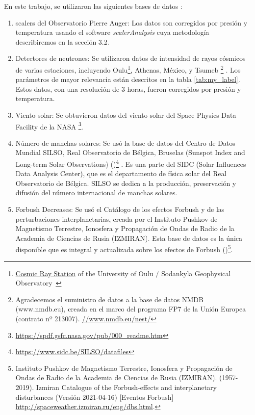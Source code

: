 En este trabajo, se utilizaron las siguientes bases de datos :
\begin{enumerate}

\item scalers del Observatorio Pierre Auger: Los datos son corregidos por presión y temperatura usando el software \textit{scalerAnalysis} cuya metodología describiremos en la sección 3.2.
    \item Detectores de neutrones: Se utilizaron datos de intensidad de rayos cósmicos de varias estaciones, incluyendo Oulu\footnote{\href{https://cosmicrays.oulu.fi/}{Cosmic Ray Station}  of the University of Oulu / Sodankyla Geophysical Observatory 
}, Athenas, México, y Tsumeb  \footnote{Agradecemos el suministro de datos a la base de datos NMDB (www.nmdb.eu), creada en el marco del programa FP7 de la Unión Europea (contrato nº 213007).  \url{//www.nmdb.eu/nest/}} . Los parámetros de mayor relevancia están descritos en la tabla \ref{tab:my_label}. Estos datos, con una resolución de 3 horas, fueron corregidos por presión y temperatura.
    \item Viento solar: Se obtuvieron datos del viento solar del Space Physics Data Facility de la NASA \footnote{\url{https://spdf.gsfc.nasa.gov/pub/000_readme.htm}}.
    \item Número de manchas solares: Se usó la base de datos del Centro de Datos Mundial SILSO, Real Observatorio de Bélgica, Bruselas (Sunspot Index and Long-term Solar Observations) (\cite{sidc})\footnote{\url{https://www.sidc.be/SILSO/datafiles}} . Es una parte del SIDC (Solar Influences Data Analysis Center), que es el departamento de física solar del Real Observatorio de Bélgica. SILSO se dedica a la producción, preservación y difusión del número internacional de manchas solares.
    \item Forbush Decreases: Se usó el Catálogo de los efectos Forbush y de las perturbaciones interplanetarias, creada por el Instituto Pushkov de Magnetismo Terrestre, Ionosfera y Propagación de Ondas de Radio de la Academia de Ciencias de Rusia (IZMIRAN). Esta base de datos es la única disponible que es integral y actualizada sobre los efectos de Forbush (\cite{okike_2021})\footnote{Instituto Pushkov de Magnetismo Terrestre, Ionosfera y Propagación de Ondas de Radio de la Academia de Ciencias de Rusia (IZMIRAN). (1957-2019). Izmiran Catalogue of the Forbush-effects and interplanetary disturbances (Versión 2021-04-16) [Eventos Forbush] \url{http://spaceweather.izmiran.ru/eng/dbs.html}.}.
\end{enumerate}

